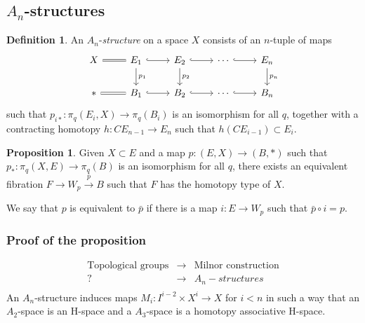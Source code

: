 \documentclass{beamer}
\theoremstyle{definition}
\newtheorem{defi}{Definition}
\newtheorem{prop}[teorema]{Proposition}
\begin{document}
\subsection{$A_n$-structures}
\begin{frame}[fragile]
\begin{defi}
An $A_n$-\emph{structure} on a space $X$ consists of an $n$-tuple of maps
\[
\begin{tikzcd}
X \arrow[r, equals] & E_1\arrow[r, hook]\arrow[d, "p_1"] & E_2\arrow[r, hook]\arrow[d, "p_2"] &\cdots\arrow[r, hook]& E_n\arrow[d, "p_n"] \\
*\arrow[r, equals] & B_1\arrow[r, hook] & 
B_2\arrow[r, hook]&\cdots\arrow[r, hook]& B_n
\end{tikzcd}
\]
such that $p_{i*}:\pi_q(E_i,X)\to \pi_q(B_i)$ is an isomorphism for all $q$, together with a contracting homotopy $h:CE_{n-1}\to E_n$ such that $h(CE_{i-1})\subset E_i$. %

\end{defi}
\end{frame}

\begin{frame}
\begin{prop}
Given $X\subset E$ and a map $p:(E,X)\to (B,*)$ such that $p_*:\pi_q(X,E)\to \pi_q(B)$ is an isomorphism for all $q$, there exists an equivalent fibration $F\to W_p\xrightarrow{\bar{p}} B$ such that $F$ has the homotopy type of $X$. 
\end{prop}\pause
We say that $p$ is equivalent to $\bar{p}$ if there is a map $i:E\to W_p$ such that $\bar{p}\circ i=p$.
 
\end{frame}
\begin{frame}
\frametitle{Proof of the proposition}
\end{frame}
\begin{frame}
\[
\begin{array}{ccc}
\text{Topological groups} & \rightarrow & \text{Milnor construction}\\
? & \rightarrow  & A_n-structures\\
& &
\end{array}
\]
\pause
An $A_n$-structure induces maps $M_i:I^{i-2}\times X^i\to X$ for $i<n$ in such a way that an $A_2$-space is an H-space and a $A_3$-space is a homotopy associative H-space. %
\end{frame}
\end{document}
